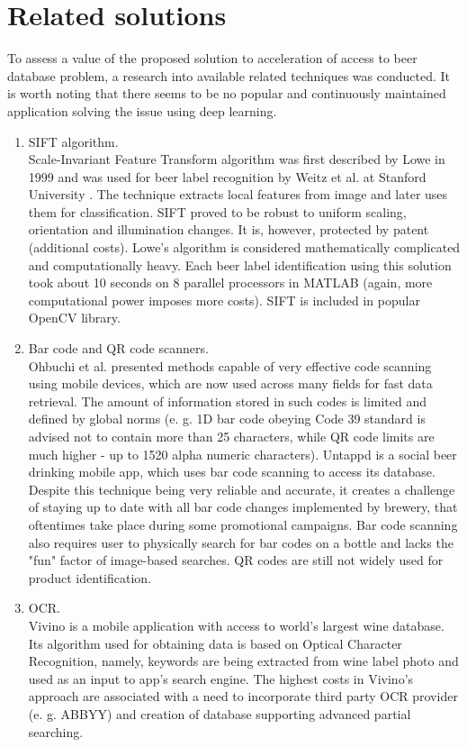\documentclass[11pt]{article}
\begin{document}
\section{Related solutions} \label{related_solutions}
To assess a value of the proposed solution to acceleration of access to beer database problem, a research into available related techniques was conducted. It is worth noting that there seems to be no popular and continuously maintained application solving the issue using deep learning. 

\begin{enumerate}[1)]
\item SIFT algorithm.\\
Scale-Invariant Feature Transform algorithm was first described by Lowe in 1999 \cite{lowe_sift} and was used for beer label recognition by Weitz et al. at Stanford University \cite{beer_sift}. The technique extracts local features from image and later uses them for classification. SIFT proved to be robust to uniform scaling, orientation and illumination changes. It is, however, protected by patent (additional costs). Lowe's algorithm is considered mathematically complicated and computationally heavy. Each beer label identification using this solution took about 10 seconds on 8 parallel processors in MATLAB (again, more computational power imposes more costs). SIFT is included in popular OpenCV library.
\item Bar code and QR code scanners.\\
Ohbuchi et al. \cite{barcode_mobile} presented methods capable of very effective code scanning using mobile devices, which are now used across many fields for fast data retrieval. The amount of information stored in such codes is limited and defined by global norms (e. g. 1D bar code obeying Code 39 standard is advised not to contain more than 25 characters, while QR code limits are much higher - up to 1520 alpha numeric characters). Untappd is a social beer drinking mobile app, which uses bar code scanning to access its database. Despite this technique being very reliable and accurate, it creates a challenge of staying up to date with all bar code changes implemented by brewery, that oftentimes take place during some promotional campaigns. Bar code scanning also requires user to physically search for bar codes on a bottle and lacks the "fun" factor of image-based searches. QR codes are still not widely used for product identification.
\item OCR.\\
Vivino is a mobile application with access to world's largest wine database. Its algorithm used for obtaining data is based on Optical Character Recognition, namely, keywords are being extracted from wine label photo and used as an input to app's search engine. The highest costs in Vivino's approach are associated with a need to incorporate third party OCR provider (e. g. ABBYY) and creation of database supporting advanced partial searching. 

\end{enumerate}
\end{document}

